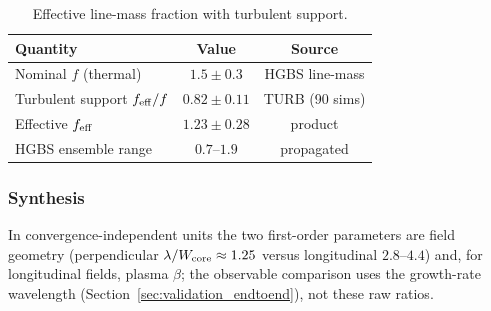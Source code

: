 \documentclass[usenatbib,twoside,twocolumn]{mnras}
\begin{document}
\begin{table}
\caption{Effective line-mass fraction with turbulent support.}
\label{tab:feff}
\footnotesize
\setlength{\tabcolsep}{4pt}
\begin{tabular}{p{3.0cm}cc}
\toprule
Quantity & Value & Source \\
\midrule
Nominal $f$ (thermal) & $1.5 \pm 0.3$ & HGBS line-mass \\
Turbulent support $f_{\rm eff}/f$ & $0.82 \pm 0.11$ & TURB (90 sims) \\
Effective $f_{\rm eff}$ & $1.23 \pm 0.28$ & product \\
HGBS ensemble range & $0.7$--$1.9$ & propagated \\
\bottomrule
\end{tabular}
\end{table}

\subsubsection{Synthesis}

In convergence-independent units the two first-order parameters are field geometry (perpendicular $\lambda/W_{\rm core}\approx1.25$ versus longitudinal $2.8$--$4.4$) and, for longitudinal fields, plasma $\beta$; the observable comparison uses the growth-rate wavelength (Section~\ref{sec:validation_endtoend}), not these raw ratios.


\end{document}
